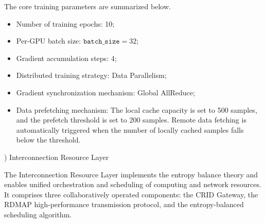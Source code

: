 \documentclass{ccjnl}
\begin{document}
The core training parameters are summarized below.

\begin{itemize}[nosep]
	
	\item Number of training epochs: 10;
	
	\item Per-GPU batch size: $\texttt{batch\_size}=32$;
	
	\item Gradient accumulation steps: 4;
	
	\item Distributed training strategy: Data Parallelism;
	
	\item Gradient synchronization mechanism: Global AllReduce;
	
	\item Data prefetching mechanism: The local cache capacity is set to 500 samples, and the prefetch threshold is set to 200 samples. Remote data fetching is automatically triggered when the number of locally cached samples falls below the threshold.
\end{itemize}

) Interconnection Resource Layer

The Interconnection Resource Layer implements the entropy balance theory and enables unified orchestration and scheduling of computing and network resources. It comprises three collaboratively operated components: the CRID Gateway, the RDMAP high-performance transmission protocol, and the entropy-balanced scheduling algorithm.
\end{document}
